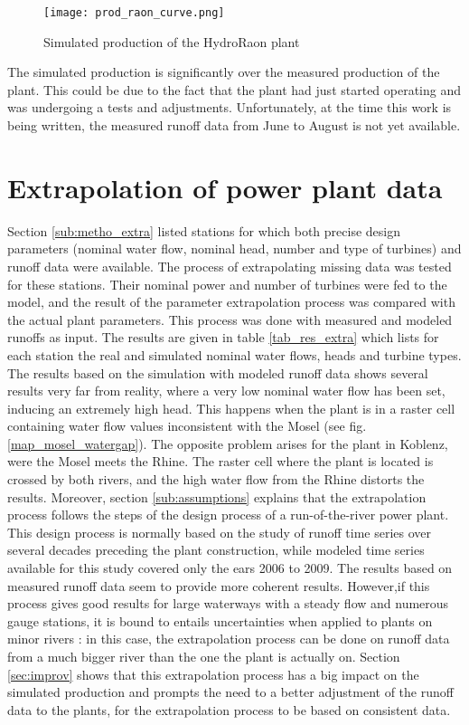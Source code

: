 \begin{figure}[H]
\centering
\texttt{[image: prod\_raon\_curve.png]}
\caption{Simulated production of the HydroRaon plant}
\label{prod_raon_curve}
\end{figure}

The simulated production is significantly over the measured production of the plant. This could be due to the fact that the plant had just started operating and was undergoing a tests and adjustments. Unfortunately, at the time this work is being written, the measured runoff data from June to August is not yet available.

\section{Extrapolation of power plant data}
\label{sec:missing_data}
Section \ref{sub:metho_extra} listed stations for which both precise design parameters (nominal water flow, nominal head, number and type of turbines) and runoff data were available. The process of extrapolating missing data was tested for these stations. Their nominal power and number of turbines were fed to the model, and the result of the parameter extrapolation process was compared with the actual plant parameters. This process was done with measured and modeled runoffs as input. The results are given in table \ref{tab_res_extra} which lists for each station the real and simulated nominal water flows, heads and turbine types. \newline
The results based on the simulation with modeled runoff data shows several results very far from reality, where a very low nominal water flow has been set, inducing an extremely high head. This happens when the plant is in a raster cell containing water flow values inconsistent with the Mosel (see fig. \ref{map_mosel_watergap}). The opposite problem arises for the plant in Koblenz, were the Mosel meets the Rhine. The raster cell where the plant is located is crossed by both rivers, and the high water flow from the Rhine distorts the results. Moreover, section \ref{sub:assumptions} explains that the extrapolation process follows the steps of the design process of a run-of-the-river power plant. This design process is normally based on the study of runoff time series over several decades preceding the plant construction, while modeled time series available for this study covered only the ears 2006 to 2009. \newline
The results based on measured runoff data seem to provide more coherent results. However,if this process gives good results for large waterways with a steady flow and numerous gauge stations, it is bound to entails uncertainties when applied to plants on minor rivers : in this case, the extrapolation process can be done on runoff data from a much bigger river than the one the plant is actually on.\newline
Section \ref{sec:improv} shows that this extrapolation process has a big impact on the simulated production and prompts the need to a better adjustment of the runoff data to the plants, for the extrapolation process to be based on consistent data.


